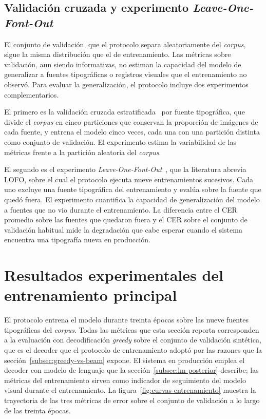 \subsection{Validación cruzada y experimento \textit{Leave-One-Font-Out}}
\label{subsec:cv-lofo}

El conjunto de validación, que el protocolo separa aleatoriamente del \textit{corpus}, sigue la misma distribución que el de entrenamiento. Las métricas sobre validación, aun siendo informativas, no estiman la capacidad del modelo de generalizar a fuentes tipográficas o registros visuales que el entrenamiento no observó. Para evaluar la generalización, el protocolo incluye dos experimentos complementarios.

El primero es la validación cruzada estratificada~\cite{kohavi1995cv} por fuente tipográfica, que divide el \textit{corpus} en cinco particiones que conservan la proporción de imágenes de cada fuente, y entrena el modelo cinco veces, cada una con una partición distinta como conjunto de validación. El experimento estima la variabilidad de las métricas frente a la partición aleatoria del \textit{corpus}.

El segundo es el experimento \textit{Leave-One-Font-Out}~\cite{etter2019synthrecipe}, que la literatura abrevia LOFO, sobre el cual el protocolo ejecuta nueve entrenamientos sucesivos. Cada uno excluye una fuente tipográfica del entrenamiento y evalúa sobre la fuente que quedó fuera. El experimento cuantifica la capacidad de generalización del modelo a fuentes que no vio durante el entrenamiento. La diferencia entre el CER promedio sobre las fuentes que quedaron fuera y el CER sobre el conjunto de validación habitual mide la degradación que cabe esperar cuando el sistema encuentra una tipografía nueva en producción.

\section{Resultados experimentales del entrenamiento principal}
\label{sec:resultados-entrenamiento}

El protocolo entrena el modelo durante treinta épocas sobre las nueve fuentes tipográficas del \textit{corpus}. Todas las métricas que esta sección reporta corresponden a la evaluación con decodificación \textit{greedy} sobre el conjunto de validación sintética, que es el decoder que el protocolo de entrenamiento adoptó por las razones que la sección~\ref{subsec:greedy-vs-beam} expone. El sistema en producción emplea el decoder con modelo de lenguaje que la sección~\ref{subsec:lm-posterior} describe; las métricas del entrenamiento sirven como indicador de seguimiento del modelo visual durante el entrenamiento. La figura~\ref{fig:curvas-entrenamiento} muestra la trayectoria de las tres métricas de error sobre el conjunto de validación a lo largo de las treinta épocas.

